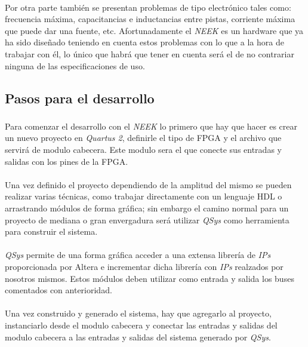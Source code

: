 \documentclass[a4paper,12pt,titlepage,final]{book}
\begin{document}
\paragraph{}
Por otra parte también se presentan problemas de tipo electrónico tales como: frecuencia máxima, capacitancias e inductancias entre pistas, corriente máxima que puede dar una fuente, etc. Afortunadamente el \textit{NEEK} es un hardware que ya ha sido diseñado teniendo en cuenta estos problemas con lo que a la hora de trabajar con él, lo único que habrá que tener en cuenta será el de no contrariar ninguna de las especificaciones de uso.

\subsection{Pasos para el desarrollo}
\subsubsection*{}
\paragraph{}
Para comenzar el desarrollo con el \textit{NEEK} lo primero que hay que hacer es crear un nuevo proyecto en \textit{Quartus 2}, definirle el tipo de FPGA y el archivo que servirá de modulo cabecera. Este modulo sera el que conecte sus entradas y salidas con los pines de la FPGA.

\paragraph{}
Una vez definido el proyecto dependiendo de la amplitud del mismo se pueden realizar varias técnicas, como trabajar directamente con un lenguaje HDL o arrastrando módulos de forma gráfica; sin embargo el camino normal para un proyecto de mediana o gran envergadura será utilizar \textit{QSys} como herramienta para construir el sistema.

\paragraph{}
\textit{QSys} permite de una forma gráfica acceder a una extensa librería de \textit{IPs} proporcionada por Altera e incrementar dicha librería con \textit{IPs} realzados por nosotros mismos. Estos módulos deben utilizar como entrada y salida los buses comentados con anterioridad.

\paragraph{}
Una vez construido y generado el sistema, hay que agregarlo al proyecto, instanciarlo desde el modulo cabecera y conectar las entradas y salidas del modulo cabecera a las entradas y salidas del sistema generado por \textit{QSys}.
\end{document}
